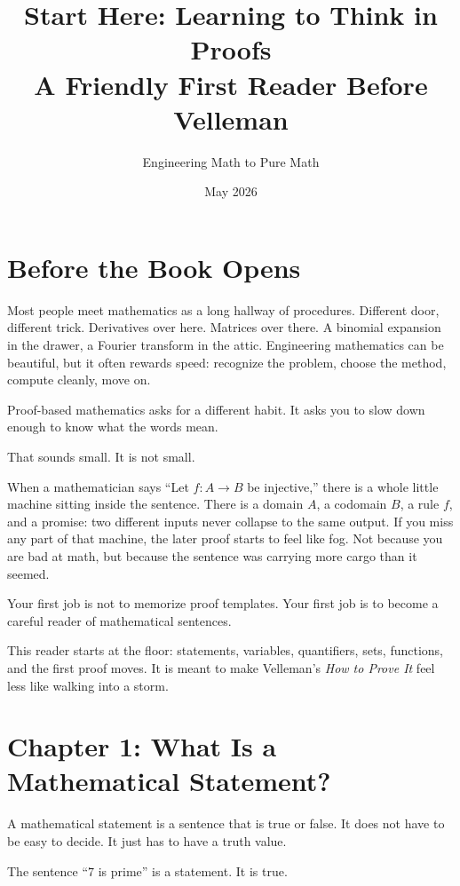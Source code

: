 \documentclass[11pt]{article}
\title{\textbf{Start Here: Learning to Think in Proofs}\\A Friendly First Reader Before Velleman}
\author{Engineering Math to Pure Math}
\date{May 2026}
\begin{document}
\maketitle
\tableofcontents
\newpage

\section{Before the Book Opens}

Most people meet mathematics as a long hallway of procedures. Different door, different trick. Derivatives over here. Matrices over there. A binomial expansion in the drawer, a Fourier transform in the attic. Engineering mathematics can be beautiful, but it often rewards speed: recognize the problem, choose the method, compute cleanly, move on.

Proof-based mathematics asks for a different habit. It asks you to slow down enough to know what the words mean.

That sounds small. It is not small.

When a mathematician says ``Let $f:A\to B$ be injective,'' there is a whole little machine sitting inside the sentence. There is a domain $A$, a codomain $B$, a rule $f$, and a promise: two different inputs never collapse to the same output. If you miss any part of that machine, the later proof starts to feel like fog. Not because you are bad at math, but because the sentence was carrying more cargo than it seemed.

\begin{focusbox}
Your first job is not to memorize proof templates. Your first job is to become a careful reader of mathematical sentences.
\end{focusbox}

This reader starts at the floor: statements, variables, quantifiers, sets, functions, and the first proof moves. It is meant to make Velleman's \emph{How to Prove It} feel less like walking into a storm.

\section{Chapter 1: What Is a Mathematical Statement?}

A mathematical statement is a sentence that is true or false. It does not have to be easy to decide. It just has to have a truth value.

\begin{example}
The sentence ``$7$ is prime'' is a statement. It is true.
\end{example}
\end{document}
